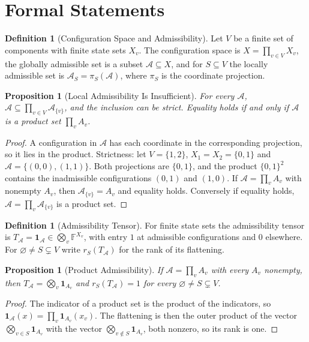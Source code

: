 \documentclass[11pt,letterpaper]{report}
\theoremstyle{plain}
\newtheorem{proposition}[theorem]{Proposition}
\theoremstyle{definition}
\newtheorem{definition}[theorem]{Definition}
\theoremstyle{remark}
\begin{document}
\section{Formal Statements}

\begin{definition}[Configuration Space and Admissibility]\label{def:configspace}
Let $V$ be a finite set of components with finite state sets $X_v$. The configuration space is $X=\prod_{v\in V}X_v$, the globally admissible set is a subset $\mathcal A\subseteq X$, and for $S\subseteq V$ the locally admissible set is $\mathcal A_S=\pi_S(\mathcal A)$, where $\pi_S$ is the coordinate projection.
\end{definition}

\begin{proposition}[Local Admissibility Is Insufficient]\label{pr:localinsuff}
For every $\mathcal A$, $\mathcal A\subseteq\prod_{v\in V}\mathcal A_{\{v\}}$, and the inclusion can be strict. Equality holds if and only if $\mathcal A$ is a product set $\prod_vA_v$.
\end{proposition}
\begin{proof}
A configuration in $\mathcal A$ has each coordinate in the corresponding projection, so it lies in the product. Strictness: let $V=\{1,2\}$, $X_1=X_2=\{0,1\}$ and $\mathcal A=\{(0,0),(1,1)\}$. Both projections are $\{0,1\}$, and the product $\{0,1\}^2$ contains the inadmissible configurations $(0,1)$ and $(1,0)$. If $\mathcal A=\prod_vA_v$ with nonempty $A_v$, then $\mathcal A_{\{v\}}=A_v$ and equality holds. Conversely if equality holds, $\mathcal A=\prod_v\mathcal A_{\{v\}}$ is a product set.
\end{proof}

\begin{definition}[Admissibility Tensor]\label{def:admtensor}
For finite state sets the admissibility tensor is $T_{\mathcal A}=\mathbf 1_{\mathcal A}\in\bigotimes_v\mathbb F^{X_v}$, with entry $1$ at admissible configurations and $0$ elsewhere. For $\varnothing\ne S\subsetneq V$ write $r_S(T_{\mathcal A})$ for the rank of its flattening.
\end{definition}

\begin{proposition}[Product Admissibility]\label{pr:productadm}
If $\mathcal A=\prod_vA_v$ with every $A_v$ nonempty, then $T_{\mathcal A}=\bigotimes_v\mathbf 1_{A_v}$ and $r_S(T_{\mathcal A})=1$ for every $\varnothing\ne S\subsetneq V$.
\end{proposition}
\begin{proof}
The indicator of a product set is the product of the indicators, so $\mathbf 1_{\mathcal A}(x)=\prod_v\mathbf 1_{A_v}(x_v)$. The flattening is then the outer product of the vector $\bigotimes_{v\in S}\mathbf 1_{A_v}$ with the vector $\bigotimes_{v\notin S}\mathbf 1_{A_v}$, both nonzero, so its rank is one.
\end{proof}
\end{document}
